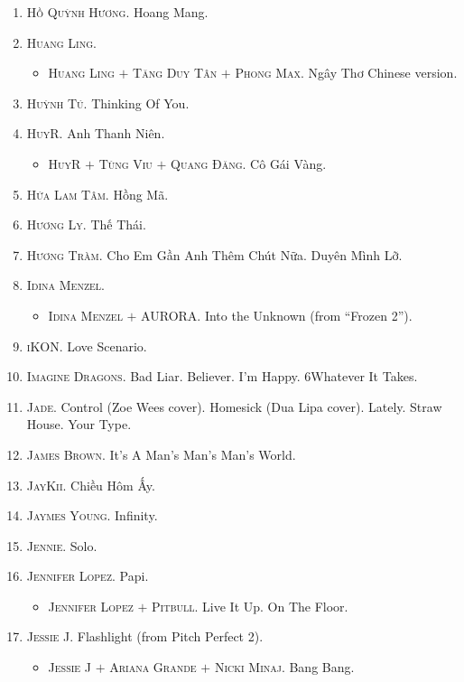\documentclass[oneside]{book}
\numberwithin{equation}{section}
\begin{document}
\begin{enumerate}
\begin{itemize}
	\end{itemize}
	\item \textsc{Hồ Quỳnh Hương.} Hoang Mang.
	\item \textsc{Huang Ling.}
	\begin{itemize}
		\item \textsc{Huang Ling $+$ Tăng Duy Tân $+$ Phong Max.} Ngây Thơ Chinese version.
	\end{itemize}
	\item \textsc{Huỳnh Tú.} Thinking Of You.
	\item \textsc{HuyR.} Anh Thanh Niên.
	\begin{itemize}
		\item \textsc{HuyR $+$ Tùng Viu $+$ Quang Đăng.} Cô Gái Vàng.
	\end{itemize}
	\item \textsc{Hứa Lam Tâm.} Hồng Mã.
	\item \textsc{Hương Ly.} Thế Thái.
	\item \textsc{Hương Tràm.} Cho Em Gần Anh Thêm Chút Nữa. Duyên Mình Lỡ.
	\item \textsc{Idina Menzel.}
	\begin{itemize}
		\item \textsc{Idina Menzel $+$ AURORA.} Into the Unknown (from ``Frozen 2'').
	\end{itemize}
	\item \textsc{iKON.} Love Scenario. 
	\item \textsc{Imagine Dragons.} Bad Liar. Believer. I'm Happy. 6Whatever It Takes.
	\item \textsc{Jade.} Control (Zoe Wees cover). Homesick (Dua Lipa cover). Lately. Straw House. Your Type.
	\item \textsc{James Brown.} It's A Man's Man's Man's World.
	\item \textsc{JayKii.} Chiều Hôm Ấy.
	\item \textsc{Jaymes Young.} Infinity.
	\item \textsc{Jennie.} Solo.
	\item \textsc{Jennifer Lopez.} Papi.
	\begin{itemize}
		\item \textsc{Jennifer Lopez $+$ Pitbull.} Live It Up. On The Floor.
	\end{itemize}
	\item \textsc{Jessie J.} Flashlight (from Pitch Perfect 2).
	\begin{itemize}
		\item \textsc{Jessie J $+$ Ariana Grande $+$ Nicki Minaj.} Bang Bang.

\end{itemize}
\end{enumerate}
\end{document}
